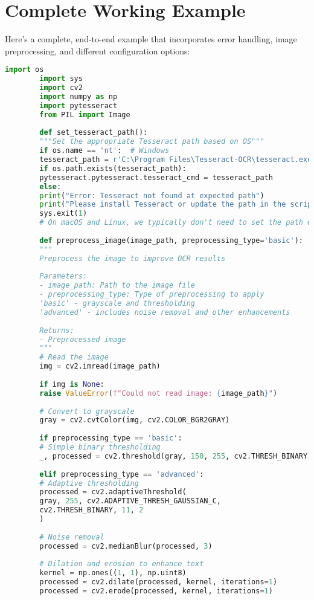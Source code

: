 \documentclass{book}
\begin{document}
	\section{Complete Working Example}
	Here's a complete, end-to-end example that incorporates error handling, image preprocessing, and different configuration options:
	
	\begin{lstlisting}[language=Python]
		import os
		import sys
		import cv2
		import numpy as np
		import pytesseract
		from PIL import Image
		
		def set_tesseract_path():
		"""Set the appropriate Tesseract path based on OS"""
		if os.name == 'nt':  # Windows
		tesseract_path = r'C:\Program Files\Tesseract-OCR\tesseract.exe'
		if os.path.exists(tesseract_path):
		pytesseract.pytesseract.tesseract_cmd = tesseract_path
		else:
		print("Error: Tesseract not found at expected path")
		print("Please install Tesseract or update the path in the script")
		sys.exit(1)
		# On macOS and Linux, we typically don't need to set the path explicitly
		
		def preprocess_image(image_path, preprocessing_type='basic'):
		"""
		Preprocess the image to improve OCR results
		
		Parameters:
		- image_path: Path to the image file
		- preprocessing_type: Type of preprocessing to apply
		'basic' - grayscale and thresholding
		'advanced' - includes noise removal and other enhancements
		
		Returns:
		- Preprocessed image
		"""
		# Read the image
		img = cv2.imread(image_path)
		
		if img is None:
		raise ValueError(f"Could not read image: {image_path}")
		
		# Convert to grayscale
		gray = cv2.cvtColor(img, cv2.COLOR_BGR2GRAY)
		
		if preprocessing_type == 'basic':
		# Simple binary thresholding
		_, processed = cv2.threshold(gray, 150, 255, cv2.THRESH_BINARY)
		
		elif preprocessing_type == 'advanced':
		# Adaptive thresholding
		processed = cv2.adaptiveThreshold(
		gray, 255, cv2.ADAPTIVE_THRESH_GAUSSIAN_C, 
		cv2.THRESH_BINARY, 11, 2
		)
		
		# Noise removal
		processed = cv2.medianBlur(processed, 3)
		
		# Dilation and erosion to enhance text
		kernel = np.ones((1, 1), np.uint8)
		processed = cv2.dilate(processed, kernel, iterations=1)
		processed = cv2.erode(processed, kernel, iterations=1)
		

\end{lstlisting}
\end{document}
